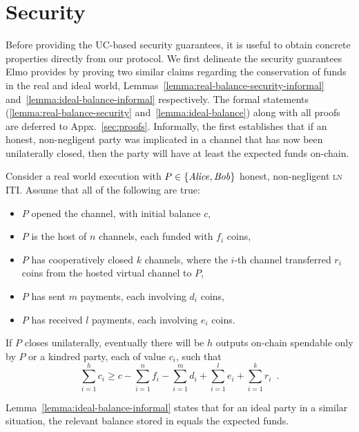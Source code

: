 \section{Security}
  \label{section:security}
  Before providing the UC-based security guarantees, it is useful to obtain
  concrete properties directly from our protocol. We first delineate the
  security guarantees Elmo provides by proving two similar claims regarding the
  conservation of funds in the real and ideal world,
  Lemmas~\ref{lemma:real-balance-security-informal}
  and~\ref{lemma:ideal-balance-informal} respectively. The formal statements
  (\ref{lemma:real-balance-security} and~\ref{lemma:ideal-balance}) along with
  all proofs are deferred
  to Appx.~\ref{sec:proofs}. Informally, the first
  establishes that if an honest, non-negligent party was implicated in a channel
  that has now been unilaterally closed,
  then the party will have at least the expected funds on-chain.

\begin{lemma}
\label{lemma:real-balance-security-informal}
  Consider a real world execution with $P \in \{\mathit{Alice}, \mathit{Bob}\}$ honest,
  non-negligent \textsc{ln} ITI. Assume that all of the following are true:
  \begin{itemize}
    \item $P$ opened the channel, with initial balance $c$,
    \item $P$ is the host of $n$ channels, each funded with $f_i$ coins,
    \item $P$ has cooperatively closed $k$ channels, where the $i$-th channel
    transferred $r_i$ coins from the hosted virtual channel to $P$,
    \item $P$ has sent $m$ payments, each involving $d_i$ coins,
    \item $P$ has received $l$ payments, each involving $e_i$ coins.
  \end{itemize}
  If $P$ closes unilaterally, eventually there will be $h$ outputs on-chain
  spendable only by $P$ or a kindred party, each of value $c_i$, such that
  \begin{equation}
    \sum\limits_{i=1}^h c_i \geq c - \sum\limits_{i=1}^n f_i -
    \sum\limits_{i=1}^m d_i + \sum\limits_{i=1}^l e_i + \sum\limits_{i=1}^k r_i
    \enspace.
  \end{equation}
\end{lemma}

  Lemma~\ref{lemma:ideal-balance-informal} states that for an ideal party in a
  similar situation, the relevant balance stored in \fchan equals the expected
  funds.

